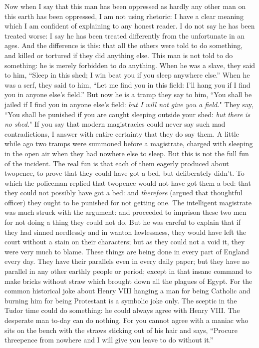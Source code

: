 \documentclass{book}
\begin{document}
Now when I say that this man has been oppressed as hardly any other man on this earth has been oppressed, I am not using rhetoric: I have a clear meaning which I am confident of explaining to any honest reader. I do not say he has been treated worse: I say he has been treated differently from the unfortunate in an ages. And the difference is this: that all the others were told to do something, and killed or tortured if they did anything else. This man is not told to do something: he is merely forbidden to do anything. When he was a slave, they said to him, “Sleep in this shed; I win beat you if you sleep anywhere else.” When he was a serf, they said to him, “Let me find you in this field: I’ll hang you if I find you in anyone else’s field.” But now he is a tramp they say to him, “You shall be jailed if I find you in anyone else’s field: \emph{but I will not give you a field.}" They say, “You shall be punished if you are caught sleeping outside your shed: \emph{but there is no shed.}" If you say that modern magistracies could never say such mad contradictions, I answer with entire certainty that they do say them. A little while ago two tramps were summoned before a magistrate, charged with sleeping in the open air when they had nowhere else to sleep. But this is not the full fun of the incident. The real fun is that each of them eagerly produced about twopence, to prove that they could have got a bed, but deliberately didn’t. To which the policeman replied that twopence would not have got them a bed: that they could not possibly have got a bed: and \emph{therefore} (argued that thoughtful officer) they ought to be punished for not getting one. The intelligent magistrate was much struck with the argument: and proceeded to imprison these two men for not doing a thing they could not do. But he was careful to explain that if they had sinned needlessly and in wanton lawlessness, they would have left the court without a stain on their characters; but as they could not a void it, they were very much to blame. These things are being done in every part of England every day. They have their parallels even in every daily paper; but they have no parallel in any other earthly people or period; except in that insane command to make bricks without straw which brought down all the plagues of Egypt. For the common historical joke about Henry VIII hanging a man for being Catholic and burning him for being Protestant is a symbolic joke only. The sceptic in the Tudor time could do something: he could always agree with Henry VIII. The desperate man to-day can do nothing. For you cannot agree with a maniac who sits on the bench with the straws sticking out of his hair and says, “Procure threepence from nowhere and I will give you leave to do without it.”
\end{document}
